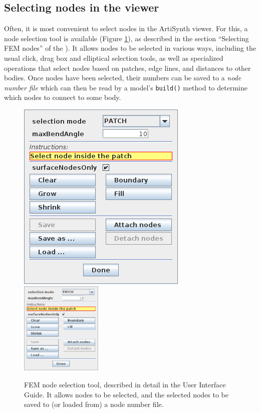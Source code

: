 \subsection{Selecting nodes in the viewer}
\label{SelectingNodesInViewer:sec}

Often, it is most convenient to select nodes in the ArtiSynth viewer.
For this, a node selection tool is available
(Figure \ref{nodeSelection:fig}), as described in the section
``Selecting FEM nodes'' of the
).
It allows nodes to be selected in various ways, including the usual
click, drag box and elliptical selection tools, as well as specialized
operations that select nodes based on patches, edge lines, and
distances to other bodies. Once nodes have been selected, their
numbers can be saved to a {\it node number file} which can then be
read by a model's {\tt build()} method to determine which nodes to
connect to some body.

\begin{figure}[ht]
\begin{center}
\iflatexml
   \includegraphics[]{images/nodeSelectToolPatch}
\else
   \includegraphics[width=0.35\textwidth]{images/nodeSelectToolPatch}
\fi
\end{center}
\caption{FEM node selection tool, described in detail in the
User Interface Guide. It allows nodes to be selected,
and the selected nodes to be saved to (or loaded from) a node number file.}
\label{nodeSelection:fig}
\end{figure}

